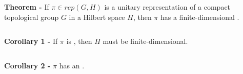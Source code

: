 \documentclass[12pt]{article}
\begin{document}
{\bf Theorem -} If $\pi \in rep(G, H)$ is a unitary representation of a compact topological group $G$ in a Hilbert space $H$, then $\pi$ has a  finite-dimensional .

$\,$

{\bf Corollary 1 -} If $\pi$ is , then $H$ must be finite-dimensional.

$\,$

{\bf Corollary 2 -} $\pi$ has an  .





\end{document}

